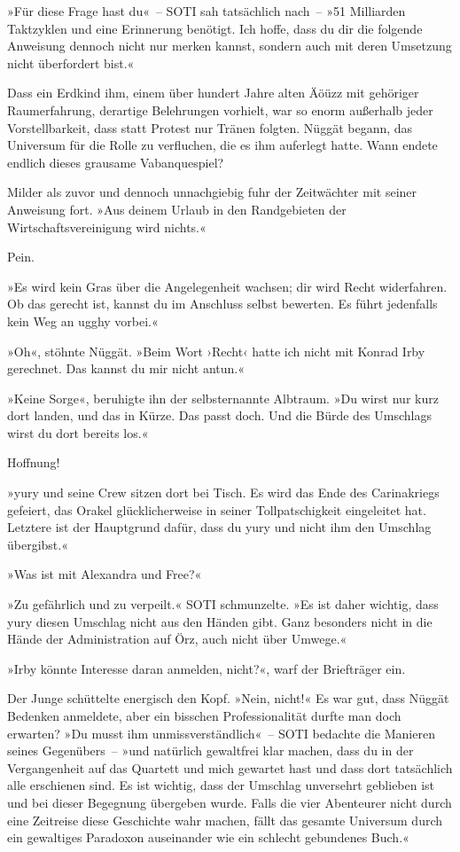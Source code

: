 »Für diese Frage hast du«~– SOTI sah tatsächlich nach~– »51 Milliarden Taktzyklen und eine Erinnerung benötigt. Ich hoffe, dass du dir die folgende Anweisung dennoch nicht nur merken kannst, sondern auch mit deren Umsetzung nicht überfordert bist.«

Dass ein Erdkind ihm, einem über hundert Jahre alten Äöüzz mit gehöriger Raumerfahrung, derartige Belehrungen vorhielt, war so enorm außerhalb jeder Vorstellbarkeit, dass statt Protest nur Tränen folgten. Nüggät begann, das Universum für die Rolle zu verfluchen, die es ihm auferlegt hatte. Wann endete endlich dieses grausame Vabanquespiel?

Milder als zuvor und dennoch unnachgiebig fuhr der Zeitwächter mit seiner Anweisung fort. »Aus deinem Urlaub in den Randgebieten der Wirtschaftsvereinigung wird nichts.«

Pein.

»Es wird kein Gras über die Angelegenheit wachsen; dir wird Recht widerfahren. Ob das gerecht ist, kannst du im Anschluss selbst bewerten. Es führt jedenfalls kein Weg an ugghy vorbei.«

»Oh«, stöhnte Nüggät. »Beim Wort ›Recht‹ hatte ich nicht mit Konrad Irby gerechnet. Das kannst du mir nicht antun.«

»Keine Sorge«, beruhigte ihn der selbsternannte Albtraum. »Du wirst nur kurz dort landen, und das in Kürze. Das passt doch. Und die Bürde des Umschlags wirst du dort bereits los.«

Hoffnung!

»yury und seine Crew sitzen dort bei Tisch. Es wird das Ende des Carinakriegs gefeiert, das Orakel glücklicherweise in seiner Tollpatschigkeit eingeleitet hat. Letztere ist der Hauptgrund dafür, dass du yury und nicht ihm den Umschlag übergibst.«

»Was ist mit Alexandra und Free?«

»Zu gefährlich und zu verpeilt.« SOTI schmunzelte. »Es ist daher wichtig, dass yury diesen Umschlag nicht aus den Händen gibt. Ganz besonders nicht in die Hände der Administration auf Örz, auch nicht über Umwege.«

»Irby könnte Interesse daran anmelden, nicht?«, warf der Briefträger ein.

Der Junge schüttelte energisch den Kopf. »Nein, nicht!« Es war gut, dass Nüggät Bedenken anmeldete, aber ein bisschen Professionalität durfte man doch erwarten? »Du musst ihm unmissverständlich«~– SOTI bedachte die Manieren seines Gegenübers~– »und natürlich gewaltfrei klar machen, dass du in der Vergangenheit auf das Quartett und mich gewartet hast und dass dort tatsächlich alle erschienen sind. Es ist wichtig, dass der Umschlag unversehrt geblieben ist und bei dieser Begegnung übergeben wurde. Falls die vier Abenteurer nicht durch eine Zeitreise diese Geschichte wahr machen, fällt das gesamte Universum durch ein gewaltiges Paradoxon auseinander wie ein schlecht gebundenes Buch.«

